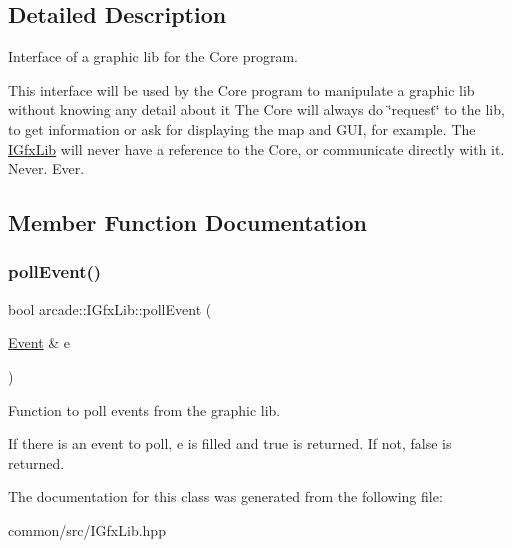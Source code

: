 \subsection{Detailed Description}
Interface of a graphic lib for the Core program. 

This interface will be used by the Core program to manipulate a graphic lib without knowing any detail about it The Core will always do \char`\"{}request\char`\"{} to the lib, to get information or ask for displaying the map and G\+UI, for example. The \hyperlink{classarcade_1_1IGfxLib}{I\+Gfx\+Lib} will never have a reference to the Core, or communicate directly with it. Never. Ever. 

\subsection{Member Function Documentation}
\mbox{\label{classarcade_1_1IGfxLib_a82cdd82f168ca898ef81edf82ca6147a}} 
\subsubsection{\texorpdfstring{poll\+Event()}{pollEvent()}}
{\footnotesize\ttfamily bool arcade\+::\+I\+Gfx\+Lib\+::poll\+Event (\begin{DoxyParamCaption}\item[{\hyperlink{structarcade_1_1Event}{Event} \&}]{e }\end{DoxyParamCaption})\hspace{0.3cm}{\ttfamily [pure virtual]}}



Function to poll events from the graphic lib. 

If there is an event to poll, e is filled and true is returned. If not, false is returned. 

The documentation for this class was generated from the following file\+:\begin{DoxyCompactItemize}
\item 
common/src/I\+Gfx\+Lib.\+hpp\end{DoxyCompactItemize}
